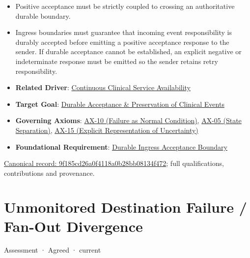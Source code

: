 \begin{itemize}


\item Positive acceptance must be strictly coupled to crossing an authoritative durable boundary.

\item Ingress boundaries must guarantee that incoming event responsibility is durably accepted before emitting a positive acceptance response to the sender. If durable acceptance cannot be established, an explicit negative or indeterminate response must be emitted so the sender retains retry responsibility.

\item \textbf{Related Driver}: \href{\detokenize{../../../../../docs/markdown/01-motivation/drivers-assessments/drivers.md}}{Continuous Clinical Service Availability}

\item \textbf{Target Goal}: \href{\detokenize{../../../../../docs/markdown/01-motivation/goals-outcomes/strategic-goals.md}}{Durable Acceptance \& Preservation of Clinical Events}

\item \textbf{Governing Axioms}: \hyperref[element:0d9673833eb840eab03804aa076c1b0c]{AX-10 (Failure as Normal Condition)}, \hyperref[element:0412a2084f0145babc4f022c71fea65f]{AX-05 (State Separation)}, \hyperref[element:ef8abbaec37e4890ad78b9f263e67906]{AX-15 (Explicit Representation of Uncertainty)}

\item \textbf{Foundational Requirement}: \href{\detokenize{../../../../../docs/markdown/01-motivation/requirements-constraints/foundational-requirements.md}}{\texttt{} Durable Ingress Acceptance Boundary}

\end{itemize}

{\footnotesize \href{../../../../continuum/motivation/assessment/9f185cd26a0f4118a0b28bb08134f472.md}{Canonical record: 9f185cd26a0f4118a0b28bb08134f472}; full qualifications, contributions and provenance.}\par
\section{Unmonitored Destination Failure / Fan-Out Divergence}

\label{element:3357fcd2f7ce457386e33a2f06ae2182}
{\small Assessment · Agreed · current}\par


